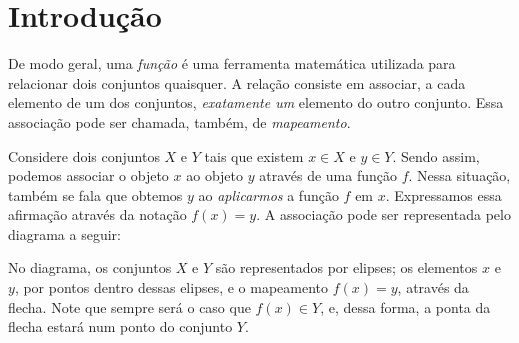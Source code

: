 \section{Introdução}

De modo geral, uma \emph{função} é uma ferramenta matemática utilizada para relacionar dois conjuntos quaisquer. 
A relação consiste em associar, a cada elemento de um dos conjuntos, \emph{exatamente um} elemento do outro conjunto.
Essa associação pode ser chamada, também, de \emph{mapeamento}.

Considere dois conjuntos $X$ e $Y$ tais que existem $x \in X$ e $y \in Y$. Sendo assim, podemos associar o objeto $x$ ao objeto $y$ através de uma função $f$. Nessa situação, também se fala que obtemos $y$ ao \emph{aplicarmos} a função $f$ em $x$. Expressamos essa afirmação através da notação $f(x) = y$. A associação pode ser representada pelo diagrama a seguir:
%
\begin{center}
\end{center}
%
No diagrama, os conjuntos $X$ e $Y$ são representados por elipses; os elementos $x$ e $y$, por pontos dentro dessas elipses, e o mapeamento $f(x) = y$, através da flecha. Note que sempre será o caso que $f(x) \in Y$, e, dessa forma, a ponta da flecha estará num ponto do conjunto $Y$.
